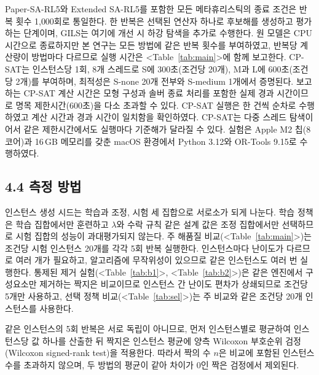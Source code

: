 \documentclass[10pt,a4paper]{article}
\begin{document}
Paper-SA-RL5와 Extended SA-RL5를 포함한 모든 메타휴리스틱의 종료 조건은 반복 횟수 1{,}000회로 통일한다.
한 반복은 선택된 연산자 하나로 후보해를 생성하고 평가하는 단계이며, GILS는 여기에 개선 시 하강 탐색을 추가로 수행한다.
원 모델은 CPU 시간으로 종료하지만 본 연구는 모든 방법에 같은 반복 횟수를 부여하였고, 반복당 계산량이 방법마다
다르므로 실행 시간은 <Table~\ref{tab:main}>에 함께 보고한다. CP-SAT는 인스턴스당 1회, 8개 스레드로 S에 300초(조건당 20개), M과 L에 600초(조건당 2개)를 부여하며, 최적성은 S-none 20개 전부와 S-medium 1개에서 증명된다. 보고하는 CP-SAT 계산 시간은 모형 구성과 솔버 종료 처리를 포함한 실제 경과 시간이므로
명목 제한시간(600초)을 다소 초과할 수 있다. CP-SAT 실행은 한 건씩 순차로 수행하였고 계산 시간과 경과 시간이 일치함을 확인하였다. CP-SAT는 다중 스레드 탐색이어서 같은 제한시간에서도 실행마다 기준해가 달라질 수 있다. 실험은 Apple M2 칩(8코어)과 16\,GB 메모리를 갖춘 macOS 환경에서 Python 3.12와 OR-Tools 9.15로 수행하였다.

\subsection{4.4 측정 방법}

인스턴스 생성 시드는 학습과 조정, 시험 세 집합으로 서로소가 되게 나눈다. 학습 정책은 학습
집합에서만 훈련하고 $\lambda$와 수락 규칙 같은 설계 값은 조정 집합에서만 선택하므로 시험 집합의
성능이 과대평가되지 않는다. 주 해품질 비교(<Table~\ref{tab:main}>)는 조건당 시험 인스턴스
20개를 각각 5회 반복 실행한다. 인스턴스마다 난이도가 다르므로 여러 개가 필요하고,
알고리즘에 무작위성이 있으므로 같은 인스턴스도 여러 번 실행한다. 통제된
제거 실험(<Table~\ref{tab:b1}>, <Table~\ref{tab:b2}>)은 같은 엔진에서 구성요소만 제거하는 짝지은 비교이므로 인스턴스 간 난이도 편차가 상쇄되므로 조건당 5개만 사용하고, 선택 정책
비교(<Table~\ref{tab:sel}>)는 주 비교와 같은 조건당 20개 인스턴스를 사용한다.

같은 인스턴스의 5회 반복은 서로 독립이 아니므로, %
먼저 인스턴스별로 평균하여 인스턴스당 값
하나를 산출한 뒤 짝지은 인스턴스 평균에 양측 Wilcoxon 부호순위 검정(Wilcoxon signed-rank test)을 적용한다. 따라서
짝의 수 $n$은 비교에 포함된 인스턴스 수를 초과하지 않으며, 두 방법의 평균이 같아 차이가 0인
짝은 검정에서 제외된다.
\end{document}
